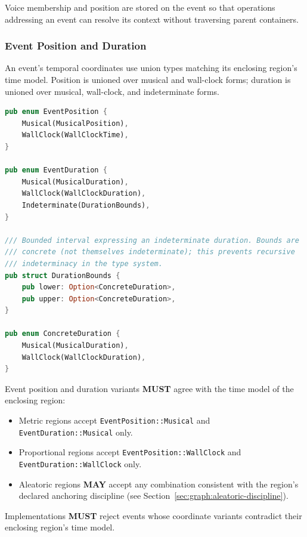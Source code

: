 \documentclass[11pt,letterpaper]{report}
\newcounter{requirement}[chapter]
\newcommand{\MUST}{\textbf{MUST}}
\newcommand{\MAY}{\textbf{MAY}}
\begin{document}
Voice membership and position are stored on the event so that
operations addressing an event can resolve its context without
traversing parent containers.

\subsubsection{Event Position and Duration}
\label{sec:graph:event-time}

An event's temporal coordinates use union types matching its enclosing
region's time model. Position is unioned over musical and wall-clock
forms; duration is unioned over musical, wall-clock, and indeterminate
forms.

\begin{lstlisting}[language=Rust]
pub enum EventPosition {
    Musical(MusicalPosition),
    WallClock(WallClockTime),
}

pub enum EventDuration {
    Musical(MusicalDuration),
    WallClock(WallClockDuration),
    Indeterminate(DurationBounds),
}

/// Bounded interval expressing an indeterminate duration. Bounds are
/// concrete (not themselves indeterminate); this prevents recursive
/// indeterminacy in the type system.
pub struct DurationBounds {
    pub lower: Option<ConcreteDuration>,
    pub upper: Option<ConcreteDuration>,
}

pub enum ConcreteDuration {
    Musical(MusicalDuration),
    WallClock(WallClockDuration),
}
\end{lstlisting}

\begin{requirement}
  \label{req:graph:region-coordinate-kinds}
  Event position and duration variants \MUST{} agree with the time
  model of the enclosing region:

  \begin{itemize}
    \item Metric regions accept \texttt{EventPosition::Musical} and
      \texttt{EventDuration::Musical} only.
    \item Proportional regions accept \texttt{EventPosition::WallClock}
      and \texttt{EventDuration::WallClock} only.
    \item Aleatoric regions \MAY{} accept any combination consistent
      with the region's declared anchoring discipline (see
      Section~\ref{sec:graph:aleatoric-discipline}).
  \end{itemize}

  Implementations \MUST{} reject events whose coordinate variants
  contradict their enclosing region's time model.
\end{requirement}
\end{document}
